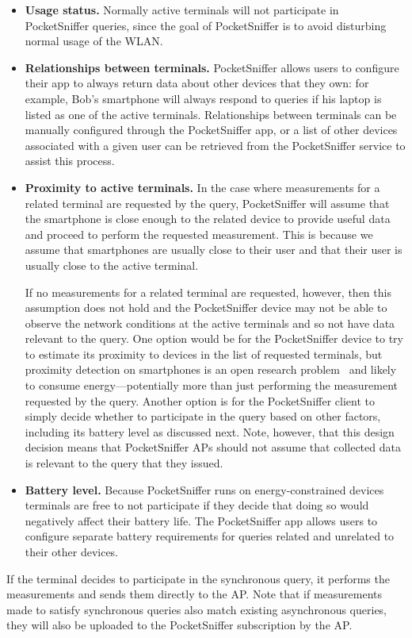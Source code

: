 \begin{itemize}

\item \textbf{Usage status.} Normally active terminals will not participate
in PocketSniffer queries, since the goal of PocketSniffer is to avoid
disturbing normal usage of the WLAN.

\item \textbf{Relationships between terminals.} PocketSniffer allows users to
configure their app to always return data about other devices that they own:
for example, Bob's smartphone will always respond to queries if his laptop is
listed as one of the active terminals. Relationships between terminals can be
manually configured through the PocketSniffer app, or a list of other devices
associated with a given user can be retrieved from the PocketSniffer service
to assist this process.

\item \textbf{Proximity to active terminals.} In the case where measurements
for a related terminal are requested by the query, PocketSniffer will assume
that the smartphone is close enough to the related device to provide useful
data and proceed to perform the requested measurement. This is because we
assume that smartphones are usually close to their user and that their user
is usually close to the active terminal.

If no measurements for a related terminal are requested, however, then this
assumption does not hold and the PocketSniffer device may not be able to
observe the network conditions at the active terminals and so not have data
relevant to the query. One option would be for the PocketSniffer device to
try to estimate its proximity to devices in the list of requested terminals,
but proximity detection on smartphones is an open research
problem~\cite{searchlight-mobicom12} and likely to consume
energy---potentially more than just performing the measurement requested by
the query. Another option is for the PocketSniffer client to simply decide
whether to participate in the query based on other factors, including its
battery level as discussed next. Note, however, that this design decision
means that PocketSniffer APs should not assume that collected data is
relevant to the query that they issued.

\item \textbf{Battery level.} Because PocketSniffer runs on
  energy-constrained devices terminals are free to not participate if they
  decide that doing so would negatively affect their battery life. The
  PocketSniffer app allows users to configure separate battery requirements
  for queries related and unrelated to their other devices.

\end{itemize}

If the terminal decides to participate in the synchronous query, it performs
the measurements and sends them directly to the AP. Note that if measurements
made to satisfy synchronous queries also match existing asynchronous queries,
they will also be uploaded to the PocketSniffer subscription by the AP.
